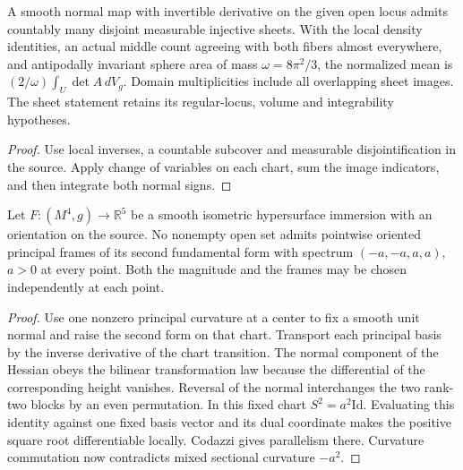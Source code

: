 \begin{proposition}
\label{prop:ed03-gauss-sheets}
\leanok
A smooth normal map with invertible derivative on the given open
locus admits countably many disjoint measurable injective sheets.
With the local density identities, an actual middle count agreeing with
both fibers almost everywhere, and antipodally invariant sphere area
of mass \(\omega=8\pi^2/3\), the normalized mean is
\((2/\omega)\int_U\det A\,dV_g\). Domain multiplicities include all
overlapping sheet images. The sheet statement retains its regular-locus,
volume and integrability hypotheses.
\end{proposition}
\begin{proof}
\leanok
Use local inverses, a countable subcover and measurable disjointification
in the source. Apply change of variables on each chart, sum the image
indicators, and then integrate both normal signs.
\end{proof}

\begin{theorem}
\label{thm:ed03-no-open-balance}
\leanok
Let \(F:(M^4,g)\to\mathbb R^5\) be a smooth isometric hypersurface
immersion with an orientation on the source. No nonempty open set admits
pointwise oriented principal frames of its second fundamental form with
spectrum \((-a,-a,a,a)\), \(a>0\) at every point. Both the magnitude
and the frames may be chosen independently at each point.
\end{theorem}
\begin{proof}
\leanok
Use one nonzero principal curvature at a center to fix a smooth unit
normal and raise the second form on that chart. Transport each principal
basis by the inverse derivative of the chart transition. The normal
component of the Hessian obeys the bilinear transformation law because
the differential of the corresponding height vanishes. Reversal of the
normal interchanges the two rank-two blocks by an even permutation.
In this fixed chart \(S^2=a^2\mathrm{Id}\). Evaluating this identity
against one fixed basis vector and its dual coordinate makes the positive
square root differentiable locally. Codazzi gives parallelism there.
Curvature commutation now contradicts mixed sectional curvature \(-a^2\).
\end{proof}

